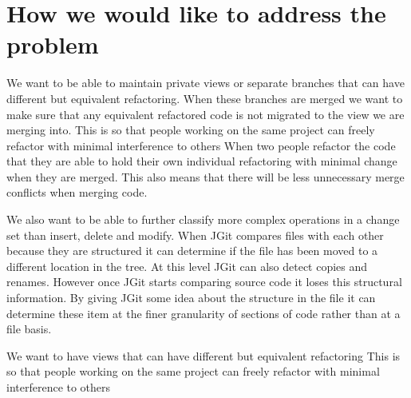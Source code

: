 
% 
% 

\section{How we would like to address the problem}
We want to be able to maintain private views or separate branches that can have different but equivalent refactoring.  When these branches are merged we want to make sure that any equivalent refactored code is not migrated to the view we are merging into.
This is so that people working on the same project can freely refactor with minimal interference to others
When two people refactor the code that they are able to hold their own individual refactoring with minimal change when they are merged.
This also means that there will be less unnecessary merge conflicts when merging code.

We also want to be able to further classify more complex operations in a change set than insert, delete and modify.  When JGit compares files with each other because they are structured it can determine if the file has been moved to a different location in the tree.  At this level JGit can also detect copies and renames.  However once JGit starts comparing source code it loses this structural information.  By giving JGit some idea about the structure in the file it can determine these item at the finer granularity of sections of code rather than at a file basis.

We want to have views that can have different but equivalent refactoring
This is so that people working on the same project can freely refactor with minimal interference to others
